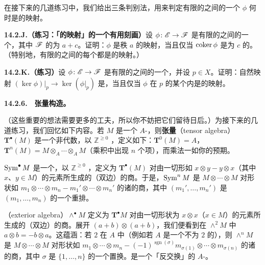 在接下来的几道练习中，我们给出三条判别法，用来判定有限\trRank{}的\trLocallyFreeSheaf{}之间的一个\trMorphism{} $\phi$ 何时是\trVectorBundle{}的映射。

\textbf{14.2.J.（练习：「\trVectorBundle{}的映射」的一个有用刻画）}\quad 设 $\phi\colon\mathscr{E}\to\mathscr{F}$ 是有限\trRank{}的\trLocallyFreeSheaf{}之间的一个\trMorphism，其中 $\mathscr{F}$ 的\trRank{}为 $a+c$。证明：$\phi$ 是秩 $a$ 的\trVectorBundle{}映射，当且仅当 $\operatorname{coker}\phi$ 是\trRank{}为 $c$ 的\trLocallyFreeSheaf。（特别地，有限\trRank{}的\trLocallyFreeSheaf{}之间的每个\trSurjectiveMap{}都是\trVectorBundle{}的映射。）

\textbf{14.2.K.（练习）}\quad 设 $\phi\colon\mathscr{E}\to\mathscr{F}$ 是有限\trRank{}的\trLocallyFreeSheaf{}之间的一个\trMorphism，并设 $p\in X$。证明：自然映射 $(\ker\phi)|_p\to\ker(\phi|_p)$ 是\trSurjectiveMap，当且仅当 $\phi$ 在 $p$ 的某个\trNeighborhood{}内是\trVectorBundle{}的映射。

\textbf{14.2.6.}\ \hard\ \textbf{张量\trAlgebra{}构造。}

（这些重要的想法需要更多的工夫，所以你不妨把它们留待日后。）为接下来的几道练习，我们回忆如下内容。若 $M$ 是一个 $A$-\trModule，则\textbf{张量\trAlgebra}（tensor algebra）$\mathbf{T}^\bullet(M)$ 是一个非\trCommutative{}代数，以 $\mathbb{Z}^{\ge 0}$ \trGrading，定义如下：$\mathbf{T}^0(M)=A$，$\mathbf{T}^n(M)=M\otimes_A\cdots\otimes_A M$（乘积中出现 $n$ 个项），而乘法一如你的预期。

\trSymmetricAlgebra{} $\operatorname{Sym}^\bullet M$ 是一个\trSymmetricAlgebra，以 $\mathbb{Z}^{\ge 0}$ \trGrading，定义为 $\mathbf{T}^\bullet(M)$ 对由一切形如 $x\otimes y-y\otimes x$（其中 $x$、$y\in M$）的元素所生成的（双边）\trIdeal{}的商。于是，$\operatorname{Sym}^n M$ 是 $M\otimes\cdots\otimes M$ 对形状如 $m_1\otimes\cdots\otimes m_n-m_1'\otimes\cdots\otimes m_n'$ 的诸\trRelation{}的商，其中 $(m_1',\dots,m_n')$ 是 $(m_1,\dots,m_n)$ 的一个重排。

\textbf{\trExteriorAlgebra}（exterior algebra）$\wedge^\bullet M$ 定义为 $\mathbf{T}^\bullet M$ 对由一切形状为 $x\otimes x$（$x\in M$）的元素所生成的（双边）\trIdeal{}的商。展开 $(a+b)\otimes(a+b)$，我们便看到在 $\wedge^2 M$ 中 $a\otimes b=-b\otimes a$。这蕴涵：若 $2$ 在 $A$ 中\trInvertible（例如若 $A$ 是一个\trCharacteristic{}不为 $2$ 的\trField），则 $\wedge^n M$ 是 $M\otimes\cdots\otimes M$ 对形状如 $m_1\otimes\cdots\otimes m_n-(-1)^{\operatorname{sgn}(\sigma)}m_{\sigma(1)}\otimes\cdots\otimes m_{\sigma(n)}$ 的诸\trRelation{}的商，其中 $\sigma$ 是 $\{1,\dots,n\}$ 的一个置换。\trExteriorAlgebra{}是一个「反交换」的 $A$-\trAlgebra。

